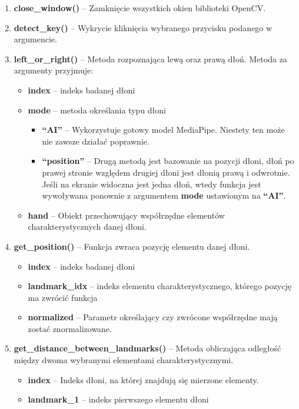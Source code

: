 \begin{enumerate}
    \item \textbf{close\_window()} -- Zamknięcie wszystkich okien biblioteki OpenCV.
    \item \textbf{detect\_key()} -- Wykrycie kliknięcia wybranego przycisku podanego w argumencie.
    \item \textbf{left\_or\_right()} -- Metoda rozpoznająca lewą oraz prawą dłoń. Metoda za argumenty przyjmuje:
    \begin{itemize}
        \item \textbf{index} -- indeks badanej dłoni
        \item \textbf{mode} -- metoda określania typu dłoni 
        \begin{itemize}
            \item \textbf{\enquote{AI}} -- Wykorzystuje gotowy model MediaPipe. Niestety ten może nie zawsze działać poprawnie. 
            \item \textbf{\enquote{position}} -- Drugą metodą jest bazowanie na pozycji dłoni, dłoń po prawej stronie względem drugiej dłoni jest dłonią prawą i odwrotnie. Jeśli na ekranie widoczna jest jedna dłoń, wtedy funkcja jest wywoływana ponownie z argumentem \textbf{mode} ustawionym na \textbf{\enquote{AI}}.
        \end{itemize}
        \item \textbf{hand} -- Obiekt przechowujący współrzędne elementów charakterystycznych danej dłoni. 
    \end{itemize}
    \item \textbf{get\_position()} -- Funkcja zwraca pozycję elementu danej dłoni. 
    \begin{itemize}
        \item \textbf{index} -- indeks badanej dłoni
        \item \textbf{landmark\_idx} -- indeks elementu charakterystycznego, którego pozycję ma zwrócić funkcja
        \item \textbf{normalized} -- Parametr określający czy zwrócone współrzędne mają zostać znormalizowane.
    \end{itemize}
    \item \textbf{get\_distance\_between\_landmarks()} -- Metoda obliczająca odległość między dwoma wybranymi elementami charakterystycznymi.
    \begin{itemize}
        \item \textbf{index} -- Indeks dłoni, na której znajdują się mierzone elementy.
        \item \textbf{landmark\_1} -- indeks pierwszego elementu dłoni

\end{itemize}
\end{enumerate}

